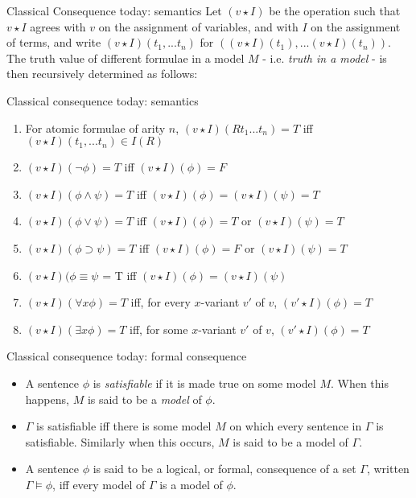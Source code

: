 \documentclass{beamer}
\begin{document}
\begin{frame}{Classical Consequence today: semantics}
		Let $(v \star I)$ be the operation such that $v \star I$ agrees with $v$ on the assignment of variables, and with $I$ on the assignment of terms, and write $(v \star I)(t_{1}, ...t_{n})$ for $((v \star I)(t_{1}), ... (v \star I)(t_{n}))$. The truth value of different formulae in a model $M$ - i.e. \textit{truth in a model} - is then recursively determined as follows:
\end{frame}
	
\begin{frame}{Classical consequence today: semantics}
		\begin{enumerate}
			\item For atomic formulae of arity $n$, $(v \star I)(Rt_{1}...t_{n}) = T$ iff $(v \star I)(t_{1}, ... t_{n}) \in I(R)$
			\pause 
			\item $(v \star I)(\neg\phi) = T$ iff $(v \star I)(\phi) = F$
			\pause
			\item $(v \star I)(\phi \wedge \psi) = T$ iff $(v \star I)(\phi) = (v \star I)(\psi) = T$
			\pause
			\item $(v \star I)(\phi \vee \psi) = T$ iff $(v \star I)(\phi) = T$ or $(v \star I)(\psi) = T$
			\pause
			\item $(v \star I)(\phi \supset \psi) = T$ iff $(v \star I)(\phi) = F$ or $(v \star I)(\psi) = T$
			\pause
			\item $(v \star I)(\phi \equiv \psi$ = T iff $(v \star I)(\phi) = (v \star I)(\psi)$
			\pause
			\item $(v \star I)(\forall x \phi) = T$ iff, for every $x$-variant $v'$ of $v$, $(v' \star I)(\phi) = T$
			\pause
			\item $(v \star I)(\exists x \phi) = T$ iff, for some $x$-variant $v'$ of $v$, $(v' \star I)(\phi) = T$
		\end{enumerate}
\end{frame}
	
\begin{frame}{Classical consequence today: formal consequence}
		\begin{itemize}
			\item A sentence $\phi$ is \textit{satisfiable} if it is made true on some model $M$. When this happens, $M$ is said to be a \textit{model} of $\phi$. 
			\pause 
			\item $\Gamma$ is satisfiable iff there is some model $M$ on which every sentence in $\Gamma$ is satisfiable. Similarly when this occurs, $M$ is said to be a model of $\Gamma$. 
			\pause
			\item A sentence $\phi$ is said to be a logical, or formal, consequence of a set $\Gamma$, written $\Gamma \models \phi$, iff every model of $\Gamma$ is a model of $\phi$.
		\end{itemize}
\end{frame}
	
\end{document}
